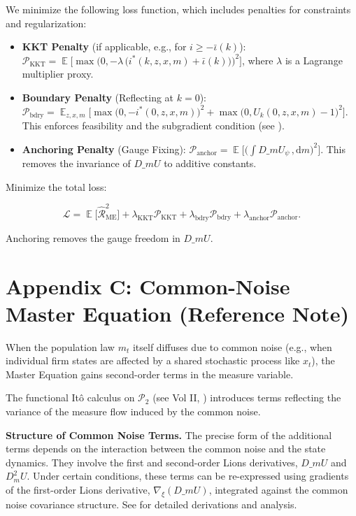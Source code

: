 ﻿\documentclass[11pt,letterpaper,oneside]{article}
\numberwithin{equation}{section}
\DeclareMathOperator{\E}{\mathbb{E}}
\newcommand{\1}{\mathbf{1}}
\newcommand{\diff}{,\mathrm{d}}
\newcommand{\dmU}{D\_m U}
\newcommand{\Dm}{D\_m}
\newcommand{\kbar}{\bar\iota}
\begin{document}
We minimize the following loss function, which includes penalties for constraints and regularization:

\begin{itemize}[leftmargin=1.25em]
    \item \textbf{KKT Penalty} (if applicable, e.g., for $i\ge -\kbar(k)$): $\displaystyle \mathcal{P}_{\mathrm{KKT}} = \E\Big[ \max\big(0, -\lambda\,\big(i^*(k,z,x,m)+\kbar(k)\big)\big)^2 \Big]$, where $\lambda$ is a Lagrange multiplier proxy.
    \item \textbf{Boundary Penalty} (Reflecting at $k=0$): $\displaystyle \mathcal{P}_{\mathrm{bdry}} = \E_{z,x,m}\Big[ \max\big(0, -i^*(0,z,x,m)\big)^2 + \max\big(0, U_k(0,z,x,m)-1\big)^2 \Big]$. This enforces feasibility and the subgradient condition (see ).
    \item \textbf{Anchoring Penalty} (Gauge Fixing): $\displaystyle \mathcal{P}_{\mathrm{anchor}}=\E\Big[\Big(\int \dmU_\psi\,\diff m\Big)^2\Big]$. This removes the invariance of $\dmU$ to additive constants.
\end{itemize}

Minimize the total loss:

$$
\mathcal{L}=\E\big[\widehat{\mathcal{R}}_{\mathrm{ME}}^2\big]+\lambda_{\mathrm{KKT}}\mathcal{P}_{\mathrm{KKT}}
+\lambda_{\mathrm{bdry}}\mathcal{P}_{\mathrm{bdry}}+\lambda_{\mathrm{anchor}}\mathcal{P}_{\mathrm{anchor}}.
$$

Anchoring removes the gauge freedom in $\dmU$.

\section{Appendix C: Common-Noise Master Equation (Reference Note)}\label{app:common-noise}

When the population law $m_t$ itself diffuses due to common noise (e.g., when individual firm states are affected by a shared stochastic process like $x_t$), the Master Equation gains second-order terms in the measure variable.

The functional It\^o calculus on $\mathcal P_2$ (see \cite{carmona_delarue_2018_mfg} Vol II, \cite{cardaliaguet_delarue_lasry_lions_2019}) introduces terms reflecting the variance of the measure flow induced by the common noise.

\begin{tcolorbox}[mathstyle]
\textbf{Structure of Common Noise Terms.} The precise form of the additional terms depends on the interaction between the common noise and the state dynamics. They involve the first and second-order Lions derivatives, $\Dm U$ and $D^2_m U$. Under certain conditions, these terms can be re-expressed using gradients of the first-order Lions derivative, $\nabla_\xi (\Dm U)$, integrated against the common noise covariance structure. See \cite{mou_zhang_cn_master} for detailed derivations and analysis.
\end{tcolorbox}
\end{document}
